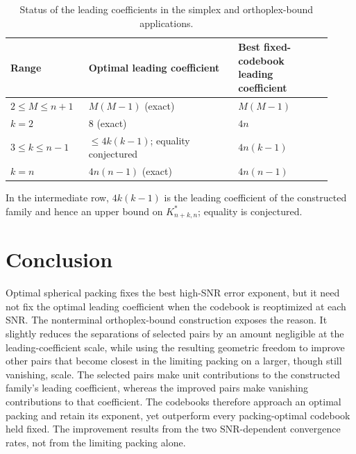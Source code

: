 \documentclass[12pt,draftclsnofoot,onecolumn]{IEEEtran}
\theoremstyle{definition}
\begin{document}
\begin{table}[!ht]
\caption{Status of the leading coefficients in the simplex and
orthoplex-bound applications.}
\label{tab:coefficient-status}
\centering
\renewcommand{\arraystretch}{1.15}
\small
\begin{tabular}{@{}p{0.22\linewidth}p{0.43\linewidth}p{0.27\linewidth}@{}}
\hline
Range & Optimal leading coefficient & Best fixed-codebook leading coefficient\\
\hline
\(2\le M\le n+1\) & \(M(M-1)\) (exact) & \(M(M-1)\)\\
\(k=2\) & \(8\) (exact) & \(4n\)\\
\(3\le k\le n-1\) &
  \(\le4k(k-1)\); equality conjectured & \(4n(k-1)\)\\
\(k=n\) & \(4n(n-1)\) (exact) & \(4n(n-1)\)\\
\hline
\end{tabular}
\vspace{1mm}

\parbox{\linewidth}{\footnotesize In the intermediate row,
\(4k(k-1)\) is the leading coefficient of the constructed family and
hence an upper bound on \(K^{\ast}_{n+k,n}\); equality is conjectured.}
\end{table}


\section{Conclusion}
\label{sec:conclusion}

Optimal spherical packing fixes the best high-SNR error exponent, but it
need not fix the optimal leading coefficient when the codebook is reoptimized at
each SNR.  The nonterminal orthoplex-bound construction exposes the reason.  It
slightly reduces the separations of selected pairs by an amount negligible
at the leading-coefficient scale, while using the resulting geometric freedom to improve
other pairs that become closest in the limiting packing on a larger,
though still vanishing, scale.  The selected pairs make unit contributions
to the constructed family's leading coefficient, whereas the improved
pairs make vanishing contributions to that coefficient.  The codebooks therefore
approach an optimal packing and retain its exponent, yet outperform every
packing-optimal codebook held fixed.  The improvement results from the two
SNR-dependent convergence rates, not from the limiting packing alone.
\end{document}
